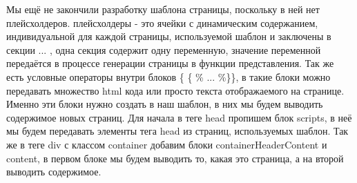 \documentclass[12pt, oldlfont, amsfonts]{report}
\begin{document}
Мы ещё не закончили разработку шаблона страницы, поскольку в ней нет { плейсхолдеров}. { плейсхолдеры} - это ячейки с динамическим содержанием, индивидуальной для каждой страницы, используемой шаблон и заключены в секции {{... }}, одна секция содержит одну переменную, значение переменной передаётся в процессе генерации страницы в функции представления. Так же есть условные операторы внутри блоков \{ \{ \% ... \%\}\}, в такие блоки можно передавать множество html кода или просто текста отображаемого на странице. Именно эти блоки нужно создать в наш шаблон, в них мы будем выводить содержимое новых страниц. Для начала в теге { head} пропишем блок {scripts}, в неё мы будем передавать элементы тега { head} из страниц, используемых шаблон. Так же в теге div с классом { container} добавим блоки { containerHeaderContent} и { content}, в первом блоке мы будем выводить то, какая это страница, а на второй выводить содержимое.
\end{document}
